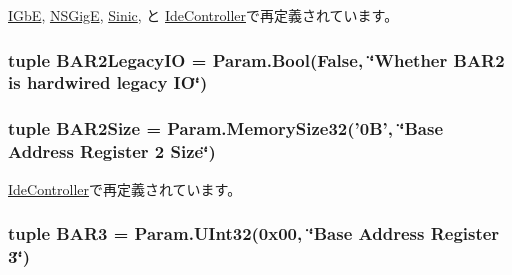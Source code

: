 \hyperlink{classEthernet_1_1IGbE_a0a6f9c88531fa1221329ec6903976a8b}{IGbE}, \hyperlink{classEthernet_1_1NSGigE_a0a6f9c88531fa1221329ec6903976a8b}{NSGigE}, \hyperlink{classEthernet_1_1Sinic_a0a6f9c88531fa1221329ec6903976a8b}{Sinic}, と \hyperlink{classIde_1_1IdeController_a0a6f9c88531fa1221329ec6903976a8b}{IdeController}で再定義されています。\hypertarget{classPci_1_1PciDevice_a28ad4ed046bf6992ae20784445248de3}{
\subsubsection[{BAR2LegacyIO}]{\setlength{\rightskip}{0pt plus 5cm}tuple {\bf BAR2LegacyIO} = Param.Bool(False, \char`\"{}Whether {\bf BAR2} is hardwired legacy IO\char`\"{})}}
\label{classPci_1_1PciDevice_a28ad4ed046bf6992ae20784445248de3}
\hypertarget{classPci_1_1PciDevice_a0643ce9d16353fc911871eb320aa2eae}{
\subsubsection[{BAR2Size}]{\setlength{\rightskip}{0pt plus 5cm}tuple {\bf BAR2Size} = Param.MemorySize32('0B', \char`\"{}Base Address Register 2 Size\char`\"{})}}
\label{classPci_1_1PciDevice_a0643ce9d16353fc911871eb320aa2eae}


\hyperlink{classIde_1_1IdeController_a7bf5305f5245e3120d4ed8431b3d9706}{IdeController}で再定義されています。\hypertarget{classPci_1_1PciDevice_a8d29325a3868fc855f430913941a20b8}{
\subsubsection[{BAR3}]{\setlength{\rightskip}{0pt plus 5cm}tuple {\bf BAR3} = Param.UInt32(0x00, \char`\"{}Base Address Register 3\char`\"{})}}
\label{classPci_1_1PciDevice_a8d29325a3868fc855f430913941a20b8}


